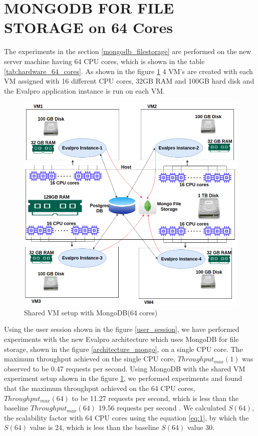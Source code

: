 \documentclass[sigconf]{acmart}
\begin{document}
\section{MONGODB FOR FILE STORAGE on 64 Cores}\label{mongo_64_cores}
The experiments in the section \ref{mongodb_filestorage} are performed on the new server machine having 64 CPU cores, which is shown in the table \ref{tab:hardware_64_cores}. As shown in the figure \ref{shared_vm_mongo_64_cores}  4 VM's are created with each VM assigned with 16  different CPU cores, 32GB RAM and 100GB hard disk and the Evalpro application instance is run on each VM.



\begin{figure}[!htb]
  \centering
  \includegraphics[width=\linewidth]{Pictures/shared_vm_mongo_64_cores.png}
  \caption{Shared VM setup with MongoDB(64 cores)}
  \label{shared_vm_mongo_64_cores}
\end{figure}

Using the user session shown in the figure \ref{user_session}, we have performed experiments with the new Evalpro architecture which uses MongoDB for file storage, shown in the figure \ref{architecture_mongo}, on a single CPU core. The maximum throughput achieved on the single CPU core, $Throughput_{max}(1)$ was observed to be 0.47 requests per second. Using MongoDB with the shared VM experiment setup shown in the figure \ref{shared_vm_mongo_64_cores}, we performed experiments and found that the maximum throughput achieved on the 64 CPU cores, $Throughput_{max}(64)$ to be 11.27 requests per second, which is less than the baseline $Throughput_{max}(64)$ 19.56 requests per second . We calculated $S(64)$, the scalability factor with 64 CPU cores using the equation \ref{eq:1}, by which the $S(64)$ value is 24, which is less than the baseline $S(64)$ value 30.
\end{document}
